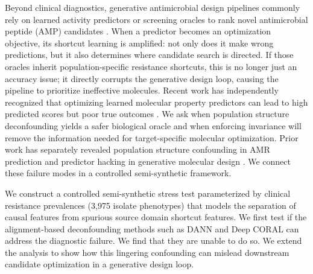 \documentclass{article}
\begin{document}
Beyond clinical diagnostics, generative antimicrobial design pipelines commonly rely on learned activity predictors or screening oracles to rank novel antimicrobial peptide (AMP) candidates \cite{das2021accelerated, szymczak2023hydramp}. When a predictor becomes an optimization objective, its shortcut learning is amplified: not only does it make wrong predictions, but it also determines where candidate search is directed. If those oracles inherit population-specific resistance shortcuts, this is no longer just an accuracy issue; it directly corrupts the generative design loop, causing the pipeline to prioritize ineffective molecules. Recent work has independently recognized that optimizing learned molecular property predictors can lead to high predicted scores but poor true outcomes \cite{gendreau2023assays, yoshizawa2025dyramo}. We ask when population structure deconfounding yields a safer biological oracle and when enforcing invariance will remove the information needed for target-specific molecular optimization. Prior work has separately revealed population structure confounding in AMR prediction \cite{yu2025population, billows2023mtb} and predictor hacking in generative molecular design \cite{gendreau2023assays, yoshizawa2025dyramo}. We connect these failure modes in a controlled semi-synthetic framework. 

We construct a controlled semi-synthetic stress test parameterized by clinical resistance prevalences (3,975 isolate phenotypes) that models the separation of causal features from spurious source domain shortcut features. We first test if the alignment-based deconfounding methods such as DANN and Deep CORAL \cite{sun2016deep} can address the diagnostic failure. We find that they are unable to do so. We extend the analysis to show how this lingering confounding can mislead downstream candidate optimization in a generative design loop.
\end{document}
